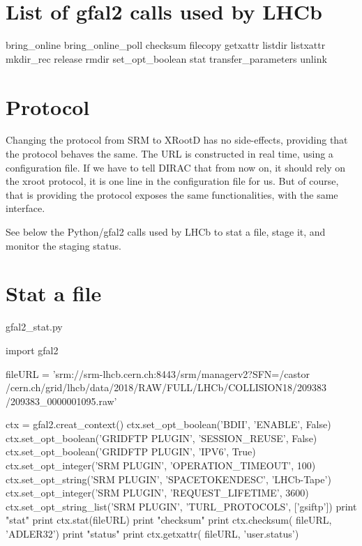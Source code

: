 \documentclass{lhcb+cta}
\begin{document}
\section*{List of gfal2 calls used by LHCb}

\begin{python}
bring_online
bring_online_poll
checksum
filecopy
getxattr
listdir
listxattr
mkdir_rec
release
rmdir
set_opt_boolean
stat
transfer_parameters
unlink
\end{python}

\section*{Protocol}

Changing the protocol from SRM to XRootD has no side-effects, providing that the protocol behaves the same. The URL is constructed in real time, using a configuration file. If we have to tell DIRAC that from now on, it should rely on the xroot protocol, it is one line in the configuration file for us. But of course, that is providing the protocol exposes the same functionalities, with the same interface.

See below the Python/gfal2 calls used by LHCb to stat a file, stage it, and monitor the staging status.

\section*{Stat a file}

\begin{python}
gfal2_stat.py

import gfal2

fileURL = 'srm://srm-lhcb.cern.ch:8443/srm/managerv2?SFN=/castor
/cern.ch/grid/lhcb/data/2018/RAW/FULL/LHCb/COLLISION18/209383
/209383_0000001095.raw'

ctx = gfal2.creat_context()
ctx.set_opt_boolean('BDII', 'ENABLE', False)
ctx.set_opt_boolean('GRIDFTP PLUGIN', 'SESSION_REUSE', False)
ctx.set_opt_boolean('GRIDFTP PLUGIN', 'IPV6', True)
ctx.set_opt_integer('SRM PLUGIN', 'OPERATION_TIMEOUT', 100)
ctx.set_opt_string('SRM PLUGIN', 'SPACETOKENDESC', 'LHCb-Tape')
ctx.set_opt_integer('SRM PLUGIN', 'REQUEST_LIFETIME', 3600)
ctx.set_opt_string_list('SRM PLUGIN', 'TURL_PROTOCOLS', ['gsiftp'])
print "stat"
print ctx.stat(fileURL)
print "checksum"
print ctx.checksum( fileURL, 'ADLER32')
print "status"
print ctx.getxattr( fileURL, 'user.status')
\end{python}
\end{document}
